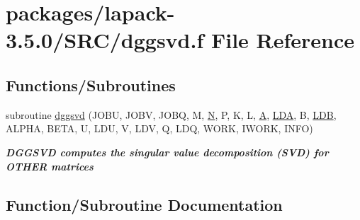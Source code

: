 \hypertarget{dggsvd_8f}{}\section{packages/lapack-\/3.5.0/\+S\+R\+C/dggsvd.f File Reference}
\label{dggsvd_8f}
\subsection*{Functions/\+Subroutines}
\begin{DoxyCompactItemize}
\item 
subroutine \hyperlink{dggsvd_8f_af81db37b433882a26f692aeff19f002e}{dggsvd} (J\+O\+B\+U, J\+O\+B\+V, J\+O\+B\+Q, M, \hyperlink{polmisc_8c_a0240ac851181b84ac374872dc5434ee4}{N}, P, K, L, \hyperlink{classA}{A}, \hyperlink{example__user_8c_ae946da542ce0db94dced19b2ecefd1aa}{L\+D\+A}, B, \hyperlink{example__user_8c_a50e90a7104df172b5a89a06c47fcca04}{L\+D\+B}, A\+L\+P\+H\+A, B\+E\+T\+A, U, L\+D\+U, V, L\+D\+V, Q, L\+D\+Q, W\+O\+R\+K, I\+W\+O\+R\+K, I\+N\+F\+O)
\begin{DoxyCompactList}\small\item\em {\bfseries  D\+G\+G\+S\+V\+D computes the singular value decomposition (S\+V\+D) for O\+T\+H\+E\+R matrices} \end{DoxyCompactList}\end{DoxyCompactItemize}


\subsection{Function/\+Subroutine Documentation}
\hypertarget{dggsvd_8f_af81db37b433882a26f692aeff19f002e}{}
